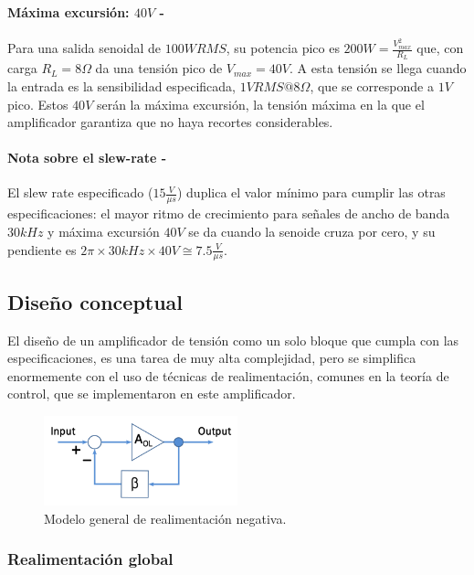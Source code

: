 \documentclass[a4paper,12pt,twoside]{article}
\begin{document}
\paragraph{Máxima excursión: $40V$ - } Para una salida senoidal de $100W RMS$, su potencia pico es $200W = \frac{V_{max}^2}{R_L}$ que, con carga $R_L=8\Omega$ da una tensión pico de $V_{max}=40V$. A esta tensión se llega cuando la entrada es la sensibilidad especificada, $1V RMS @8\Omega$, que se corresponde a $1V$ pico. Estos $40V$ serán la máxima excursión, la tensión máxima en la que el amplificador garantiza que no haya recortes considerables.

\paragraph{Nota sobre el slew-rate - } El slew rate especificado ($15\frac{V}{\mu s}$) duplica el valor mínimo para cumplir las otras especificaciones: el mayor ritmo de crecimiento para señales de ancho de banda $30kHz$ y máxima excursión $40V$ se da cuando la senoide cruza por cero, y su pendiente es $2 \pi \times 30kHz\times 40V\cong 7.5\frac{V}{\mu s}$. 


\subsection{Diseño conceptual}

El diseño de un amplificador de tensión como un solo bloque que cumpla con las especificaciones, es una tarea de muy alta complejidad, pero se simplifica enormemente con el uso de técnicas de realimentación, comunes en la teoría de control, que se implementaron en este amplificador. 

\begin{figure}[H]
	\centering
	\includegraphics[width=0.5\textwidth]{img/realimentacion-negativa-bloque}
	\caption{Modelo general de realimentación negativa.}
	\label{fig:realimentacion-negativa-bloque}
\end{figure}


\subsubsection{Realimentación global}
\end{document}
